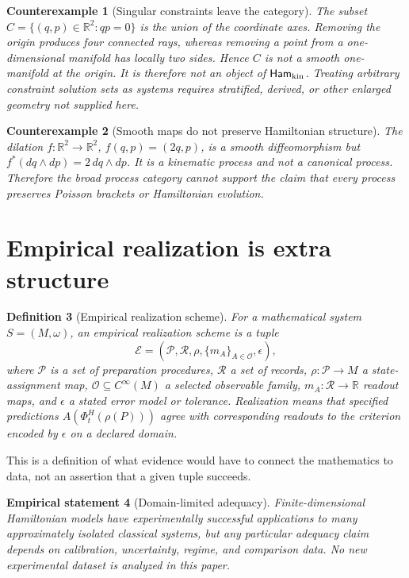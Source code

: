 \documentclass[11pt]{article}
\newtheorem{definition}{Definition}[section]
\newtheorem{empirical}[definition]{Empirical statement}
\newtheorem{counterexample}[definition]{Counterexample}
\newcommand{\Ham}{\mathsf{Ham}}
\newcommand{\R}{\mathbb R}
\begin{document}
\begin{counterexample}[Singular constraints leave the category]
The subset $C=\{(q,p)\in\R^2:qp=0\}$ is the union of the coordinate axes.  Removing the origin produces four connected rays, whereas removing a point from a one-dimensional manifold has locally two sides.  Hence $C$ is not a smooth one-manifold at the origin.  It is therefore not an object of $\Ham_{\rm kin}$.  Treating arbitrary constraint solution sets as systems requires stratified, derived, or other enlarged geometry not supplied here.
\end{counterexample}

\begin{counterexample}[Smooth maps do not preserve Hamiltonian structure]
The dilation $f:\R^2\to\R^2$, $f(q,p)=(2q,p)$, is a smooth diffeomorphism but
$f^*(dq\wedge dp)=2\,dq\wedge dp$.  It is a kinematic process and not a canonical process.  Therefore the broad process category cannot support the claim that every process preserves Poisson brackets or Hamiltonian evolution.
\end{counterexample}

\section{Empirical realization is extra structure}

\begin{definition}[Empirical realization scheme]
For a mathematical system $S=(M,\omega)$, an empirical realization scheme is a tuple
\[
 \mathcal E=(\mathcal P,\mathcal R,\rho,\{m_A\}_{A\in\mathcal O},\epsilon),
\]
where $\mathcal P$ is a set of preparation procedures, $\mathcal R$ a set of records, $\rho:\mathcal P\to M$ a state-assignment map, $\mathcal O\subseteq C^\infty(M)$ a selected observable family, $m_A:\mathcal R\to\R$ readout maps, and $\epsilon$ a stated error model or tolerance.  Realization means that specified predictions $A(\Phi_t^H(\rho(P)))$ agree with corresponding readouts to the criterion encoded by $\epsilon$ on a declared domain.
\end{definition}
This is a definition of what evidence would have to connect the mathematics to data, not an assertion that a given tuple succeeds.

\begin{empirical}[Domain-limited adequacy]
Finite-dimensional Hamiltonian models have experimentally successful applications to many approximately isolated classical systems, but any particular adequacy claim depends on calibration, uncertainty, regime, and comparison data.  No new experimental dataset is analyzed in this paper.
\end{empirical}
\end{document}
